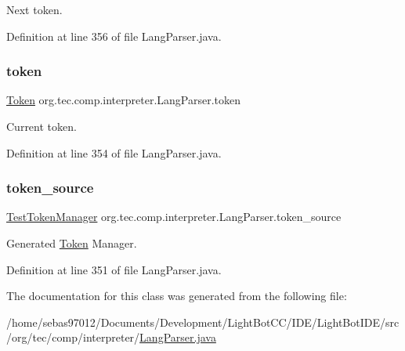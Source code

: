 Next token. 

Definition at line 356 of file Lang\+Parser.\+java.

\mbox{\label{classorg_1_1tec_1_1comp_1_1interpreter_1_1_lang_parser_a3b137d2c81757602c7d71a1a7ecc3691}} 
\subsubsection{\texorpdfstring{token}{token}}
{\footnotesize\ttfamily \mbox{\hyperlink{classorg_1_1tec_1_1comp_1_1interpreter_1_1_token}{Token}} org.\+tec.\+comp.\+interpreter.\+Lang\+Parser.\+token\hspace{0.3cm}{\ttfamily [static]}}

Current token. 

Definition at line 354 of file Lang\+Parser.\+java.

\mbox{\label{classorg_1_1tec_1_1comp_1_1interpreter_1_1_lang_parser_a5b135742fa26954be3b9de68eaccaf68}} 
\subsubsection{\texorpdfstring{token\+\_\+source}{token\_source}}
{\footnotesize\ttfamily \mbox{\hyperlink{classorg_1_1tec_1_1comp_1_1interpreter_1_1_test_token_manager}{Test\+Token\+Manager}} org.\+tec.\+comp.\+interpreter.\+Lang\+Parser.\+token\+\_\+source\hspace{0.3cm}{\ttfamily [static]}}

Generated \mbox{\hyperlink{classorg_1_1tec_1_1comp_1_1interpreter_1_1_token}{Token}} Manager. 

Definition at line 351 of file Lang\+Parser.\+java.



The documentation for this class was generated from the following file\+:\begin{DoxyCompactItemize}
\item 
/home/sebas97012/\+Documents/\+Development/\+Light\+Bot\+C\+C/\+I\+D\+E/\+Light\+Bot\+I\+D\+E/src/org/tec/comp/interpreter/\mbox{\hyperlink{_lang_parser_8java}{Lang\+Parser.\+java}}\end{DoxyCompactItemize}
